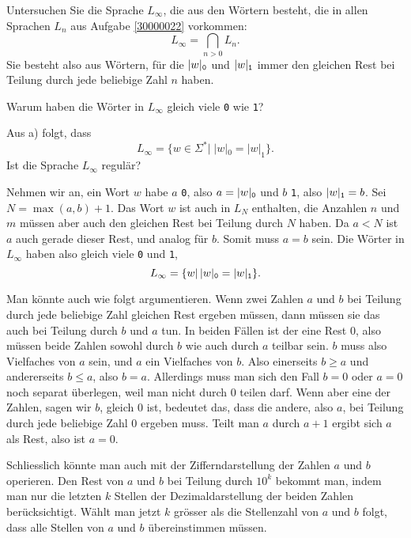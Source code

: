 Untersuchen Sie die Sprache $L_\infty$, die aus den Wörtern besteht, die
in allen Sprachen $L_n$ aus Aufgabe \ref{30000022} vorkommen:
\[
L_{\infty} = \bigcap_{n>0}L_n.
\]
Sie besteht also aus Wörtern, für die
$|w|_{\tt 0}$ und
$|w|_{\tt 1}$ immer den gleichen Rest bei Teilung durch jede beliebige
Zahl $n$ haben.

\begin{teilaufgaben}
\item Warum haben die Wörter in $L_\infty$ gleich viele {\tt 0}
wie {\tt 1}?
\item Aus a) folgt, dass
$$L_\infty = \{w\in\Sigma^*|\;|w|_0=|w|_1\}.$$
Ist die Sprache $L_\infty$ regulär?
\end{teilaufgaben}

\begin{loesung}
\begin{teilaufgaben}
\item Nehmen wir an, ein Wort $w$ habe $a$ {\tt 0}, also $a=|w|_{\tt 0}$ und
$b$ {\tt 1}, also $|w|_{\tt 1}=b$.
Sei $N=\max(a,b) + 1$. Das Wort $w$ ist auch in $L_N$ enthalten,
die Anzahlen $n$ und $m$ müssen aber auch den gleichen Rest bei
Teilung durch $N$ haben. Da $a<N$ ist $a$ auch gerade dieser Rest,
und analog für $b$. Somit muss $a=b$ sein. Die Wörter in
$L_\infty$ haben also gleich viele {\tt 0} und {\tt 1},
\[
L_\infty=\{w|\,|w|_{\tt 0}=|w|_{\tt 1}\}.
\]

Man könnte auch wie folgt argumentieren. Wenn zwei Zahlen $a$ und $b$
bei Teilung durch jede beliebige Zahl gleichen Rest ergeben müssen,
dann müssen sie das auch bei Teilung durch $b$ und $a$ tun. In beiden
Fällen ist der eine Rest $0$, also müssen beide Zahlen sowohl durch
$b$ wie auch durch $a$ teilbar sein. $b$ muss also Vielfaches von $a$
sein, und $a$ ein Vielfaches von $b$. Also einerseits $b\ge a$ und andererseits
$b\le a$, also $b=a$. Allerdings muss man sich den Fall $b=0$ oder $a=0$
noch separat überlegen, weil man nicht durch $0$ teilen darf. Wenn
aber eine der Zahlen, sagen wir $b$, gleich $0$ ist, bedeutet das, dass
die andere, also $a$, bei Teilung durch jede beliebige Zahl $0$ ergeben
muss. Teilt man $a$ durch $a+1$ ergibt sich $a$ als Rest, also ist $a=0$.

Schliesslich könnte man auch mit der Zifferndarstellung der Zahlen
$a$ und $b$ operieren. Den Rest von $a$ und $b$ bei Teilung durch
$10^k$ bekommt man, indem man nur die letzten $k$ Stellen der
Dezimaldarstellung der beiden Zahlen berücksichtigt. Wählt man
jetzt $k$ grösser als die Stellenzahl von $a$ und $b$ folgt,
dass alle Stellen von $a$ und $b$ übereinstimmen müssen.


\end{teilaufgaben}
\end{loesung}
